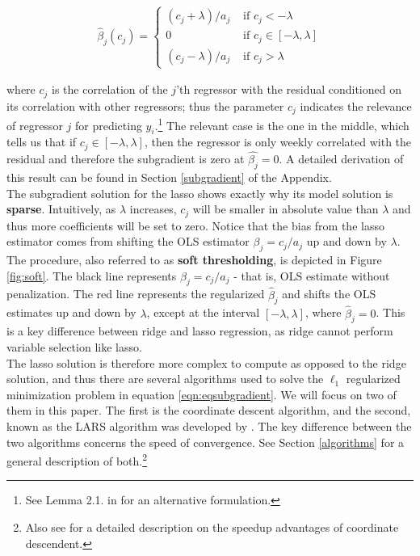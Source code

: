 \begin{align}
\label{eqn:eqsubgradient}
\hat{\beta}_{j}\left(c_{j}\right)=\left\{\begin{array}{cc}\left(c_{j}+\lambda\right) / a_{j} & \text { if } c_{j}<-\lambda \\ 0 & \text { if } c_{j} \in[-\lambda, \lambda] \\ \left(c_{j}-\lambda\right) / a_{j} & \text { if } c_{j}>\lambda\end{array}\right.
\end{align}

\noindent where $c_j$ is the correlation of the $j$'th regressor with the residual conditioned on its correlation with other regressors; thus the parameter $c_j$ indicates the relevance of regressor $j$ for predicting $y_i$.\footnote{See Lemma 2.1. in \cite{buhlmann2011statistics} for an alternative formulation.} The relevant case is the one in the middle, which tells us that if $c_{j} \in[-\lambda, \lambda]$, then the regressor is only weekly correlated with the residual and therefore the subgradient is zero at $\hat{\beta_j}=0$. A detailed derivation of this result can be found in Section \ref{subgradient} of the Appendix. \\

\noindent The subgradient solution for the lasso shows exactly why its model solution is \textbf{sparse}.
Intuitively, as $\lambda$ increases, $c_j$ will be smaller in absolute value than $\lambda$ and thus more coefficients will be set to zero. Notice that the bias from the lasso estimator comes from shifting the OLS estimator $\beta_j=c_j/a_j$ up and down by $\lambda$. The procedure, also referred to as \textbf{soft thresholding}, is depicted in Figure \ref{fig:soft}. The black line represents $\beta_j=c_j/a_j$ - that is, OLS estimate without penalization. The red line represents the regularized $\hat{\beta}_j$ and shifts the OLS estimates up and down by $\lambda$, except at the interval $[-\lambda, \lambda]$, where $\hat{\beta}_j=0$. This is a key difference between ridge and lasso regression, as ridge cannot perform variable selection like lasso.\\ 

\noindent The lasso solution is therefore more complex to compute as opposed to the ridge solution, and thus there are several algorithms used to solve the $\ell_1$ regularized minimization problem in equation \eqref{eqn:eqsubgradient}. We will focus on two of them in this paper. The first is the coordinate descent algorithm, and the second, known as the LARS algorithm  was developed by \cite{efron2004least}. The key difference between the two algorithms concerns the speed of convergence. See Section \ref{algorithms} for a general description of both.\footnote{Also see \cite{hastie2008fast} for a detailed description on the speedup advantages of coordinate descendent.}\\

